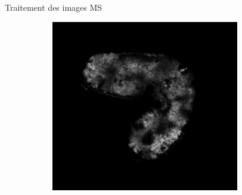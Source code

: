 \documentclass[10pt]{beamer}
\begin{document}
\begin{frame}{Traitement des images MS}
\begin{figure}[ht]
\begin{subfigure}[t]{0.33\textwidth}
      \caption{}
      \label{subfig:maldi_500_density_s5}
    \end{subfigure}%
    \begin{subfigure}[t]{0.33\textwidth}
      \centering
      \includegraphics[width=0.9\textwidth]{fig/maldi_650_density_s8}
      \caption{}
      \label{subfig:maldi_650_density_s8}
    \end{subfigure}%
  \end{figure}
\end{frame}
\end{document}
